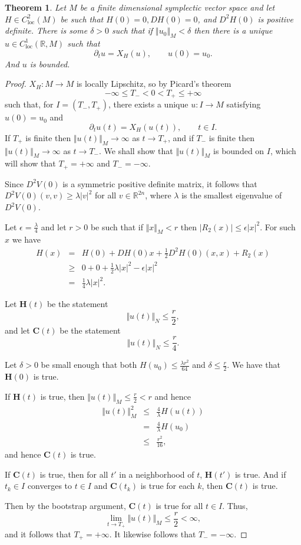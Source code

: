 \documentclass{article}
\newcommand{\norm}[1]{\Vert #1 \Vert}
\newtheorem{theorem}{Theorem}
\begin{document}
\begin{theorem}
Let $M$ be a finite dimensional symplectic vector space and let $H \in C^2_{\textrm{loc}}(M)$ be such that $H(0)=0,
DH(0)=0$, and $D^2H(0)$ is positive definite. There is some $\delta>0$ such that if
$\norm{u_0}_M<\delta$ then there is a unique $u \in C^1_{\text{loc}}(\mathbb{R},M)$ such that
\[
\partial_t u = X_H(u), \qquad u(0)=u_0.
\]
And $u$ is bounded.
\end{theorem}
\begin{proof}
$X_H:M \to M$ is locally Lipschitz, so by Picard's theorem 
\[
-\infty \leq T_- < 0 < T_+ \leq +\infty
\]
such that, for $I=(T_-,T_+)$, there exists a unique $u:I \to M$ satisfying  $u(0)=u_0$ and
\[
\partial_t u(t)=X_H(u(t)), \qquad t \in I.
\]
If $T_+$ is finite then $\norm{u(t)}_M \to \infty$ as $t \to T_+$, and if $T_-$ is finite then $\norm{u(t)}_M \to \infty$ as $t \to T_-$. 
We shall show that $\norm{u(t)}_M$ is bounded on $I$, which will show that $T_+=+\infty$ and $T_-=-\infty$.

Since $D^2 V(0)$ is a symmetric positive definite matrix, it follows that $D^2 V(0)(v,v) \geq \lambda |v|^2$ for all $v \in
\mathbb{R}^{2n}$, where $\lambda$ is the smallest eigenvalue of $D^2 V(0)$. 

Let $\epsilon=\frac{\lambda}{4}$ and let $r>0$ be such that if $\norm{x}_M < r$ then $|R_2(x)| \leq \epsilon |x|^2$. For such $x$ we have
\begin{eqnarray*}
H(x)&=&H(0)+DH(0)x+\frac{1}{2}D^2H(0)(x,x)+R_2(x)\\
&\geq&0+0+\frac{1}{2} \lambda |x|^2-\epsilon|x|^2\\
&=&\frac{1}{4}\lambda |x|^2.
\end{eqnarray*}

Let $\mathbf{H}(t)$ be the statement
\[
\norm{u(t)}_N \leq \frac{r}{2},
\]
and let $\mathbf{C}(t)$ be the statement
\[
\norm{u(t)}_N \leq \frac{r}{4}.
\]

Let $\delta>0$ be small enough that both $H(u_0) \leq \frac{\lambda r^2}{64}$ and $\delta \leq \frac{r}{2}$. 
We have that $\mathbf{H}(0)$ is true.

If $\mathbf{H}(t)$ is true, then $\norm{u(t)}_M \leq \frac{r}{2}<r$ and hence
\begin{eqnarray*}
\norm{u(t)}_M^2&\leq&\frac{4}{\lambda}H(u(t))\\
&=&\frac{4}{\lambda}H(u_0)\\
&\leq&\frac{r^2}{16},
\end{eqnarray*}
and hence $\mathbf{C}(t)$ is true.

If $\mathbf{C}(t)$ is true, then for all $t'$ in a neighborhood of $t$, $\mathbf{H}(t')$ is true. And if $t_k \in I$ converges to $t \in I$ and $\mathbf{C}(t_k)$ is true for each $k$, then 
$\mathbf{C}(t)$ is true.

Then by the bootstrap argument, $\mathbf{C}(t)$ is true for all $t \in I$. Thus,
\[
\lim_{t \to T_+} \norm{u(t)}_M \leq \frac{r}{2}<\infty,
\]
and it follows that $T_+=+\infty$. It likewise  follows that $T_-=-\infty$.
\end{proof}
\end{document}
